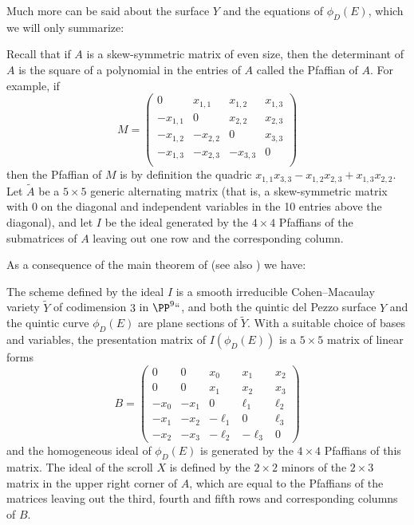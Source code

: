 Much more can be said about the surface $Y$ and the equations of $\phi_D(E)$, which we will only summarize:

\begin{fact}
Recall that if $A$ is a skew-symmetric matrix of even size,
then the determinant of $A$ is the square of a polynomial in the entries of $A$ called the Pfaffian of $A$. For example, if
%
$$
M = \begin{pmatrix}
0&x_{1,1}&x_{1,2}&x_{1,3}\\
-x_{1,1}&0&x_{2,2}&x_{2,3}\\
-x_{1,2}&-x_{2,2}&0&x_{3,3}\\
-x_{1,3}&-x_{2,3}&-x_{3,3}&0\\
\end{pmatrix}
$$
then the Pfaffian of $M$ is by definition the quadric $x_{1,1}x_{3,3}-x_{1,2}x_{2,3}+x_{1,3}x_{2,2}$.
Let $\tilde A$ be a $5\times 5$ generic alternating matrix (that is, a skew-symmetric matrix with 0 on the diagonal and independent variables
in the 10 entries above the diagonal), and let $I$ be the ideal
generated by the $4\times 4$ Pfaffians of
the submatrices of $A$ leaving out one row and the corresponding column.

\hskip-1pt As a consequence of the main theorem of  \cite{MR453723} 
(see also \cite[Theorem 11]{Eisenbud1995}) we have:

\begin{proposition} \label{5x5 Pfaffians}
The scheme defined by 
the ideal
$I$ is a smooth irreducible Cohen--Macaulay variety $\tilde Y$ of codimension 
$3$ in $\PP^9` `$,
and both the quintic del Pezzo surface $Y$ and the quintic curve $\phi_D(E)$ are plane sections of $\tilde Y$.
With a suitable choice of bases and variables,  the presentation
matrix of $I(\phi_D(E))$ is 
a $5\times 5$ matrix of linear forms 
$$
B =\begin{pmatrix}
0&0&x_0&x_1&x_2\\
0&0&x_1&x_2&x_3\\
-x_0&-x_1&0&\ell_1&\ell_2\\
-x_1&-x_2&-\ell_1&0&\ell_3\\
-x_2&-x_3&-\ell_2&-\ell_3&0
\end{pmatrix}
$$
and
the homogeneous ideal of $\phi_D(E)$ is generated by the  $4\times 4$ Pfaffians of this matrix. The ideal of 
the scroll $X$ is defined by the $2\times 2$ minors of the $2\times 3$ matrix in the upper right corner of $A$, which
are equal to the Pfaffians of the matrices leaving out the 
third, fourth and fifth 
rows
and corresponding columns of $B$.
\vspace*{-1.4\baselineskip}
\end{proposition}
\end{fact}

